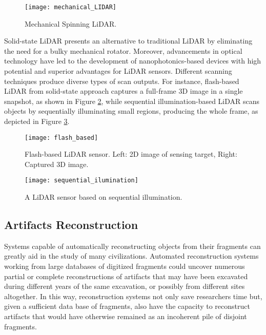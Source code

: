  
\begin{figure}[h!]
    \centering
    \texttt{[image: mechanical\_LIDAR]}
    \caption{Mechanical Spinning \gls{LiDAR}.~\cite{inbook}}
    \label{fig:mechanical_LIDAR}
\end{figure} 
\FloatBarrier


Solid-state \gls{LiDAR} presents an alternative to traditional \gls{LiDAR} by eliminating the need for a bulky mechanical rotator. %
Moreover, advancements in optical technology have led to the development of nanophotonics-based devices with high potential and superior advantages for \gls{LiDAR} sensors. %
Different scanning techniques produce diverse types of scan outputs. For instance, flash-based LiDAR from solid-state approach captures a full-frame \gls{3D} image in a single snapshot, as shown in Figure \ref{fig:flash_based}, while sequential illumination-based LiDAR scans objects by sequentially illuminating small regions, producing the whole frame, as depicted in Figure \ref{fig:sequential_ilumination}.

\begin{figure}[h!]
    \centering
    \texttt{[image: flash\_based]}
    \caption{Flash-based \gls{LiDAR} sensor. \small{Left: \gls{2D} image of sensing target, Right: Captured \gls{3D} image.} ~\cite{li2022progress}}
    \label{fig:flash_based}
\end{figure} 



\begin{figure}[h!]
    \centering
    \texttt{[image: sequential\_ilumination]}
    \caption{A \gls{LiDAR} sensor based on sequential illumination.~\cite{li2022progress}}
    \label{fig:sequential_ilumination}
\end{figure} 

\FloatBarrier

\subsection{Artifacts Reconstruction}
\label{sec:reconstruction}

Systems capable of automatically reconstructing objects from their fragments can greatly aid in the study of many civilizations.
Automated reconstruction systems working from large databases of digitized fragments could uncover numerous partial or
complete reconstructions of artifacts that may have been excavated during different years of the same excavation, or possibly
from different sites altogether. In this way, reconstruction systems not only save researchers time but, given a sufficient data
base of fragments, also have the capacity to reconstruct artifacts that would have otherwise remained as an incoherent pile of disjoint fragments.
~\cite{willis2008computational}

